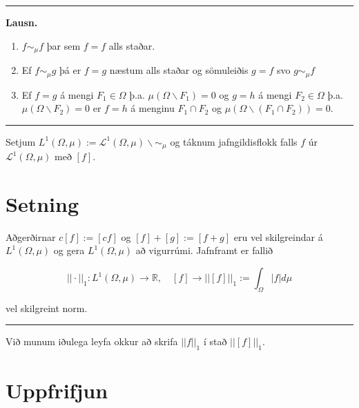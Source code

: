 \documentclass[]{book}
\providecommand{\tightlist}{%
  \setlength{\itemsep}{0pt}\setlength{\parskip}{0pt}}
\begin{document}
\begin{center}\rule{0.5\linewidth}{\linethickness}\end{center}

\textbf{Lausn.}

\begin{enumerate}
\def\labelenumi{\arabic{enumi}.}
\tightlist
\item
  \(f \sim_\mu f\) þar sem \(f=f\) alls staðar.
\item
  Ef \(f\sim_\mu g\) þá er \(f=g\) næstum alls staðar og sömuleiðis \(g=f\) svo \(g\sim_\mu f\)
\item
  Ef \(f=g\) á mengi \(F_1\in \Omega\) þ.a. \(\mu(\Omega\backslash F_1)=0\) og \(g=h\) á mengi \(F_2\in\Omega\) þ.a. \(\mu(\Omega\backslash F_2)=0\) er \(f=h\) á menginu \(F_1\cap F_2\) og \(\mu(\Omega\backslash(F_1\cap F_2)) = 0\).
\end{enumerate}

\begin{center}\rule{0.5\linewidth}{\linethickness}\end{center}

Setjum \(L^1(\Omega,\mu) := \mathcal L^1(\Omega,\mu)\backslash\sim_\mu\) og táknum jafngildisflokk falls \(f\) úr \(\mathcal L^1(\Omega,\mu)\) með \([f]\).

\hypertarget{setning-67}{%
\section*{Setning}\label{setning-67}}

Aðgerðirnar \(c[f]:=[cf]\) og \([f] + [g] := [f + g]\) eru vel skilgreindar á \(L^1(\Omega,\mu)\) og gera \(L^1(\Omega,\mu)\) að vigurrúmi. Jafnframt er fallið

\[
||\cdot||_1: L^1(\Omega,\mu)\rightarrow\mathbb R,\quad[f]\rightarrow||[f]||_1:=\int_\Omega|f|d\mu
\]

vel skilgreint norm.

\begin{center}\rule{0.5\linewidth}{\linethickness}\end{center}

Við munum iðulega leyfa okkur að skrifa \(||f||_1\) í stað \(||[f]||_1\).

\hypertarget{uppfrifjun}{%
\section*{Uppfrifjun}\label{uppfrifjun}}
\end{document}
